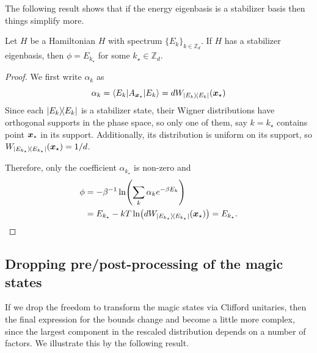 \documentclass[pra,
aps,
twocolumn,
superscriptaddress,
groupedaddress,
nofootinbib,
reprint
]{revtex4-1}
\begin{document}
The following result shows that if the energy eigenbasis is a stabilizer basis then things simplify more.
\begin{proposition} \label{sharp-phi}
	Let $H$ be a Hamiltonian $H$ with spectrum $\{E_k\}_{k \in \mathbb{Z}_d}$.
	If $H$ has a stabilizer eigenbasis, then $\phi = E_{k_{\star}}$ for some $k_{\star} \in \mathbb{Z}_d$.
\end{proposition}
\begin{proof}
	We first write $\alpha_k$ as
\begin{equation}
	\alpha_k = \langle E_k | A_{\bm{x}_{\star}} |E_k\rangle = d W_{\ketbra{E_k}}(\bm{x}_{\star})
\end{equation}
Since each $\ketbra{E_k}$ is a stabilizer state, their Wigner distributions have orthogonal supports in the phase space, so only one of them, say $k = k_{\star}$ contains point $\bm{x}_{\star}$ in its support. 
Additionally, its distribution is uniform on its support, so $W_{\ketbra{E_{k_{\star}}}}(\bm{x}_{\star}) = 1/d$.

Therefore, only the coefficient $\alpha_{k_{\star}}$ is non-zero and
\begin{align}
\phi &= -\beta^{-1}\ln (\sum_k \alpha_k e^{-\beta E_k}) \nonumber \\
&=E_{k_{\star}} -kT \ln (d W_{\ketbra{E_{k_{\star}}}}(\bm{x}_{\star})) =E_{k_{\star}}.
\end{align}
\end{proof}

\subsection{Dropping pre/post-processing of the magic states}
\label{app:cliff_processing}

If we drop the freedom to transform the magic states via Clifford unitaries, then the final expression for the bounds change and become a little more complex, since the largest component in the rescaled distribution depends on a number of factors. We illustrate this by the following result.
\end{document}
